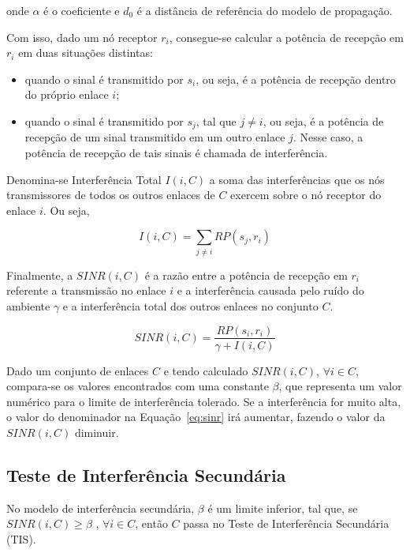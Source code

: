 onde $\alpha$ é o coeficiente e $d_{0}$ é a distância de referência do modelo de propagação.

Com isso, dado um nó receptor $r_{i}$, consegue-se calcular a potência de recepção em $r_{i}$ em duas situações distintas:

\begin{itemize} %

\item quando o sinal é transmitido por $s_{i}$, ou seja, é a potência de recepção dentro do próprio enlace $i$; 
\item quando o sinal é transmitido por $s_{j}$, tal que $j \neq i$, ou seja, é a potência de recepção de um sinal transmitido em um outro enlace $j$. Nesse caso, a potência de recepção de tais sinais é chamada de interferência. 

\end{itemize}

Denomina-se Interferência Total $I(i,C)$ a soma das interferências que os nós transmissores de todos os outros enlaces de $C$ exercem sobre o nó receptor do enlace $i$. Ou seja,

\begin{equation}
I(i,C) = \sum_{j \neq i} RP(s_{j},r_{i})
\end{equation}

Finalmente, a $SINR(i,C)$ é a razão entre a potência de recepção em $r_{i}$ referente a transmissão no enlace $i$ e a interferência causada pelo ruído do ambiente $\gamma$ e a interferência total dos outros enlaces no conjunto $C$.

\begin{equation}
SINR(i,C) = \frac{RP(s_{i},r_{i})} {\gamma + I(i,C)}
\label{eq:sinr}  
\end{equation}

Dado um conjunto de enlaces $C$ e tendo calculado $SINR(i,C)$, $\forall i \in C$, compara-se os valores encontrados com uma constante $\beta$, que representa um valor numérico para o limite de interferência tolerado. Se a interferência for muito alta, o valor do denominador na Equação~\ref{eq:sinr} irá aumentar, fazendo o valor da $SINR(i,C)$ diminuir. 

\subsection{Teste de Interferência Secundária}

No modelo de interferência secundária, $\beta$ é um limite inferior, tal que, se $SINR(i,C) \geq \beta$ , $\forall i \in C$, então $C$ passa no Teste de Interferência Secundária (TIS).

